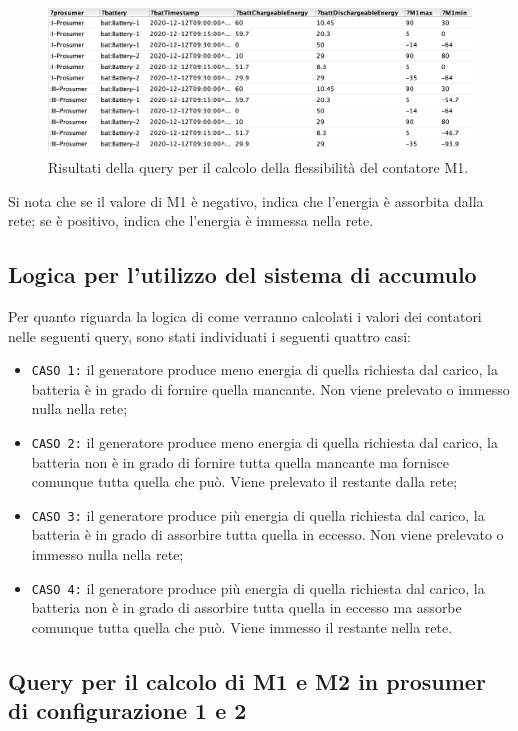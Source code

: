 \begin{figure}[H]
    \centering
    \includegraphics[width=15cm]{images/query_flessibilita_res.png}
    \caption{Risultati della query per il calcolo della flessibilità del contatore M1.}
    \label{fig:query_flessibilita_res}
\end{figure}

Si nota che se il valore di M1 è negativo, indica che l'energia è assorbita dalla rete; se è positivo, indica che l'energia è immessa nella rete.

\subsection{Logica per l'utilizzo del sistema di accumulo}
Per quanto riguarda la logica di come verranno calcolati i valori dei contatori nelle seguenti query, sono stati individuati i seguenti quattro casi:
\begin{itemize}
    \item \texttt{CASO 1:} il generatore produce meno energia di quella richiesta dal carico, la batteria è in grado di fornire quella mancante. Non viene prelevato o immesso nulla nella rete;
    \item \texttt{CASO 2:} il generatore produce meno energia di quella richiesta dal carico, la batteria non è in grado di fornire tutta quella mancante ma fornisce comunque tutta quella che può. Viene prelevato il restante dalla rete;
    \item \texttt{CASO 3:} il generatore produce più energia di quella richiesta dal carico, la batteria è in grado di assorbire tutta quella in eccesso. Non viene prelevato o immesso nulla nella rete;
    \item \texttt{CASO 4:} il generatore produce più energia di quella richiesta dal carico, la batteria non è in grado di assorbire tutta quella in eccesso ma assorbe comunque tutta quella che può. Viene immesso il restante nella rete.
\end{itemize}

\subsection{Query per il calcolo di M1 e M2 in prosumer di configurazione 1 e 2}

